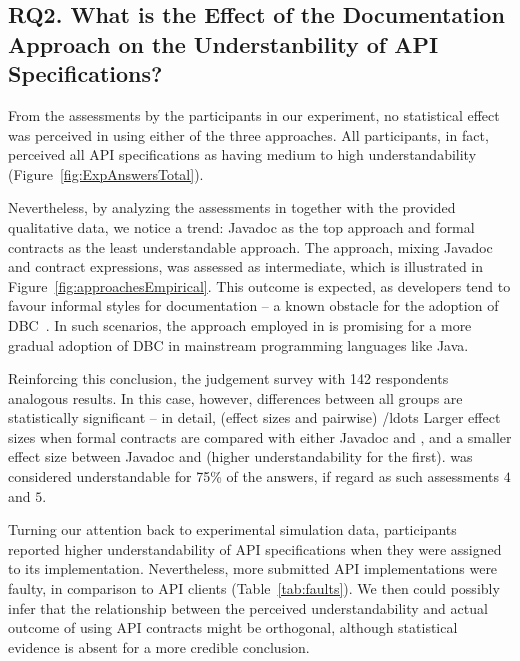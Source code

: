 \subsection{RQ2. What is the Effect of the Documentation Approach on the Understanbility of API Specifications?}
\label{rq2}

From the assessments by the participants in our experiment, no statistical effect was perceived in using either of the three approaches. All participants, in fact, perceived all API specifications as having medium to high understandability (Figure~\ref{fig:ExpAnswersTotal}). 

Nevertheless, by analyzing the assessments in together with the provided qualitative data, we notice a trend: Javadoc as the top approach and formal contracts as the least understandable approach. The \contractjdoc{} approach, mixing Javadoc and contract expressions, was assessed as intermediate, which is illustrated in Figure~\ref{fig:approachesEmpirical}.
This outcome is expected, as developers tend to favour informal styles for documentation -- a known obstacle for the adoption of DBC~\cite{}. In such scenarios, the approach employed in \contractjdoc{} is promising for a more gradual adoption of DBC in mainstream programming languages like Java.

Reinforcing this conclusion, the judgement survey with 142 respondents analogous results. 
In this case, however, differences between all groups are statistically significant -- in detail, (effect sizes and pairwise) /ldots
Larger effect sizes when formal contracts are compared with either Javadoc and \contractjdoc{}, and a smaller effect size between Javadoc and \contractjdoc{} (higher understandability for the first).
\contractjdoc{} was considered understandable for 75\% of the answers, if regard as such assessments $4$ and $5$.

Turning our attention back to experimental simulation data, participants reported higher understandability of API specifications when they were assigned to its implementation. Nevertheless, more submitted API implementations were faulty, in comparison to API clients (Table~\ref{tab:faults}). 
We then could possibly infer that the relationship between the perceived understandability and actual outcome of using API contracts might be orthogonal, although statistical evidence is absent for a more credible conclusion. 


